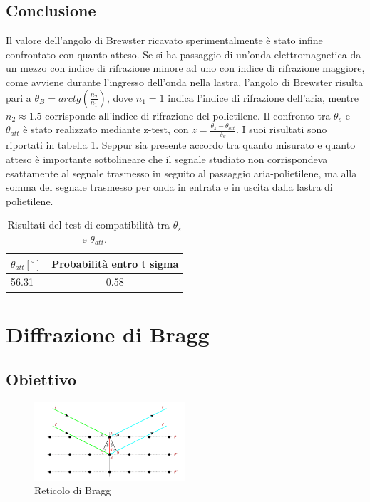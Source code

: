 \documentclass[a4paper]{article}
\begin{document}
\subsection{Conclusione}
Il valore dell'angolo di Brewster ricavato sperimentalmente è stato infine confrontato con quanto atteso. Se si ha passaggio di un'onda elettromagnetica da un mezzo con indice di rifrazione minore ad uno con indice di rifrazione maggiore, come avviene durante l'ingresso dell'onda nella lastra, l'angolo di Brewster risulta pari a $\theta_B = arctg(\frac{n_2}{n_1})$, dove $n_1 = 1$ indica l'indice di rifrazione dell'aria, mentre $n_2 \approx 1.5$ corrisponde all'indice di rifrazione del polietilene. Il confronto tra $\theta_{s}$ e $\theta_{att}$ è stato realizzato mediante z-test, con $z = \frac{\theta_s - \theta_{att}}{\delta_{\theta}}$. I suoi risultati sono riportati in tabella \ref{tab:brewster_compatibilita}. Seppur sia presente accordo tra quanto misurato e quanto atteso è importante sottolineare che il segnale studiato non corrispondeva esattamente al segnale trasmesso in seguito al passaggio aria-polietilene, ma alla somma del segnale trasmesso per onda in entrata e in uscita dalla lastra di polietilene.
\begin{table}[htbp] 
\centering
\begin{tabular}{|l|c|}
\hline
$\theta_{att} [^\circ]$ & Probabilità entro t sigma \\
\hline
56.31 & 0.58 \\
\hline
\end{tabular}
\caption{Risultati del test di compatibilità tra $\theta_s$ e $\theta_{att}$.}
\label{tab:brewster_compatibilita}
\end{table}


\section{Diffrazione di Bragg}
\subsection{Obiettivo}
\begin{figure}[htbp]
	\centering
	\includegraphics[width=0.5\textwidth]{grafici/schema.bragg.png}
	\caption{Reticolo di Bragg}
	\label{schema.bragg}
\end{figure}
\end{document}
